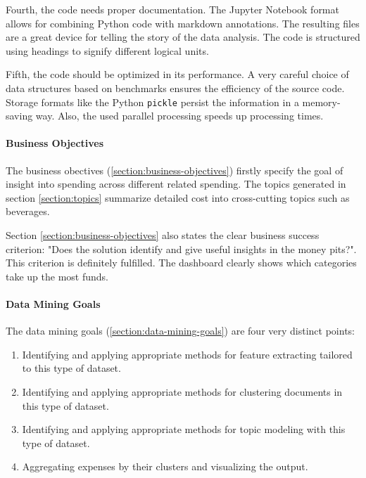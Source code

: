 Fourth, the code needs proper documentation. The Jupyter Notebook format allows for combining Python code with markdown annotations. The resulting files are a great device for telling the story of the data analysis. The code is structured using headings to signify different logical units.

Fifth, the code should be optimized in its performance. A very careful choice of data structures based on benchmarks ensures the efficiency of the source code. Storage formats like the Python \lstinline|pickle| persist the information in a memory-saving way. Also, the used parallel processing speeds up processing times.

\paragraph{Business Objectives}
The business obectives (\ref{section:business-objectives}) firstly specify the goal of insight into spending across different related spending. The topics generated in section \ref{section:topics} summarize detailed cost into cross-cutting topics such as beverages. 



Section \ref{section:business-objectives} also states the clear business success criterion: "Does the solution identify and give useful insights in the money pits?". This criterion is definitely fulfilled. The dashboard clearly shows which categories take up the most funds.


\paragraph{Data Mining Goals}
The data mining goals (\ref{section:data-mining-goals}) are four very distinct points:
\begin{enumerate}
	\item Identifying and applying appropriate methods for feature extracting tailored to this type of dataset.
	\item Identifying and applying appropriate methods for clustering documents in this type of dataset.
	\item Identifying and applying appropriate methods for topic modeling with this type of dataset.
	\item Aggregating expenses by their clusters and visualizing the output.
\end{enumerate}


